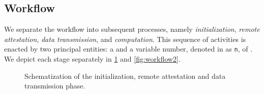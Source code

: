 \subsection{Workflow}

We separate the workflow into subsequent processes, namely \textit{initialization}, \textit{remote attestation}, \textit{data transmission}, and \textit{computation}. This sequence of activities is enacted by two principal entities: a  and a variable number, denoted in as \texttt{n}, of . We depict each stage separately in \cref{fig:workflow} and \cref{fig:workflow2}.

\begin{figure}[t]
	\hfill
	\hfill
	\hfill
	\caption{Schematization of the initialization, remote attestation and data transmission phase.}
	\label{fig:workflow}
\end{figure}
